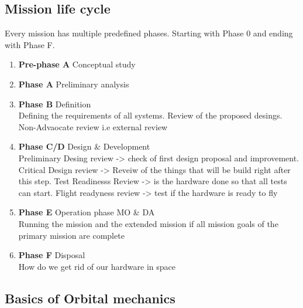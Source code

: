 \subsection{Mission life cycle}
 Every mission has multiple predefined phases. Starting with Phase 0 and ending with Phase F. 
 \begin{enumerate}
     \item \textbf{Pre-phase A} Conceptual study\\
     
     \item \textbf{Phase A} Preliminary analysis\\
      
      \item \textbf{Phase B}  Definition\\
      Defining the requirements of all systems. Review of the proposed desings. Non-Advaocate review i.e external review
      \item \textbf{Phase C/D} Design \& Development \\
      Preliminary Desing review -> check of first design proposal and improvement. Critical Design review -> Reveiw of the things that will be build right after this step. Test Readinesss Review -> is the hardware done so that all tests can start. Flight readyness review -> test if the hardware is ready to fly
      \item \textbf{Phase E} Operation phase \ac{MO} \& \ac{DA}\\
      Running the mission and the extended mission if all mission goals of the primary mission are complete
      \item \textbf{Phase F} Disposal\\
      How do we get rid of our hardware in space 
      
 \end{enumerate}

\subsection{Basics of Orbital mechanics}

